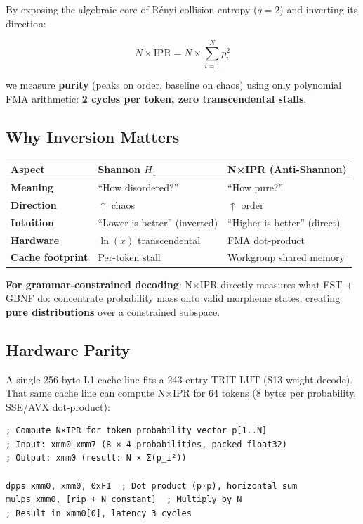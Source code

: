\documentclass[11pt,oneside]{article}
\begin{document}
By exposing the algebraic core of Rényi collision entropy ($q=2$) and inverting its direction:

\[N \times \text{IPR} = N \times \sum_{i=1}^{N} p_i^2\]

we measure \textbf{purity} (peaks on order, baseline on chaos) using only polynomial FMA arithmetic: \textbf{2 cycles per token, zero transcendental stalls}.

\subsection{Why Inversion Matters}

\begin{center}
\begin{tabular}{lll}
\toprule
Aspect & Shannon $H_1$ & N×IPR (Anti-Shannon) \\
\midrule
\textbf{Meaning} & ``How disordered?'' & ``How pure?'' \\
\textbf{Direction} & $\uparrow$ chaos & $\uparrow$ order \\
\textbf{Intuition} & ``Lower is better'' (inverted) & ``Higher is better'' (direct) \\
\textbf{Hardware} & $\ln(x)$ transcendental & FMA dot-product \\
\textbf{Cache footprint} & Per-token stall & Workgroup shared memory \\
\bottomrule
\end{tabular}
\end{center}

\textbf{For grammar-constrained decoding}: N×IPR directly measures what FST + GBNF do: concentrate probability mass onto valid morpheme states, creating \textbf{pure distributions} over a constrained subspace.

\subsection{Hardware Parity}

A single 256-byte L1 cache line fits a 243-entry TRIT LUT (S13 weight decode). That same cache line can compute N×IPR for 64 tokens (8 bytes per probability, SSE/AVX dot-product):

\begin{lstlisting}
; Compute N×IPR for token probability vector p[1..N]
; Input: xmm0-xmm7 (8 × 4 probabilities, packed float32)
; Output: xmm0 (result: N × Σ(p_i²))

dpps xmm0, xmm0, 0xF1  ; Dot product (p·p), horizontal sum
mulps xmm0, [rip + N_constant]  ; Multiply by N
; Result in xmm0[0], latency 3 cycles
\end{lstlisting}
\end{document}
